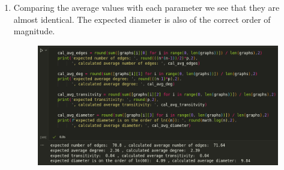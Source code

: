 \documentclass{article}
\begin{document}
    \begin{enumerate}[label=(\alph*), left=10pt, itemsep=10pt]
        \item \begin{minipage}[t]{0.9\textwidth}
            Comparing the average values with each parameter we see that they are almost identical. The expected diameter
            is also of the correct order of magnitude.
            \begin{figure}[H]
                \centering
                \includegraphics[width=1\textwidth, height=0.3\textheight]{./3a.png}
            \end{figure}
        \end{minipage}
        

\end{enumerate}
\end{document}
